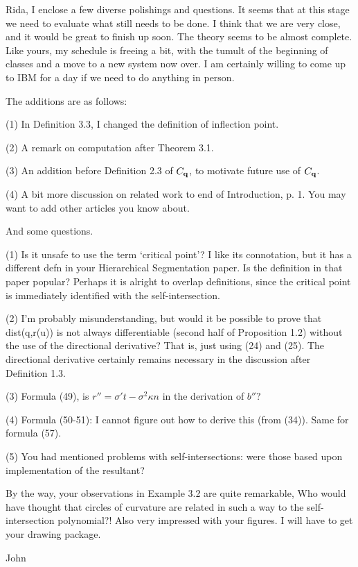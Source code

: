 Rida,
	I enclose a few diverse polishings and questions.
It seems that at this stage we need to evaluate what still needs to be done.
I think that we are very close, and it would be great to finish up soon.
The theory seems to be almost complete.
Like yours, my schedule is freeing a bit, with the tumult of the
beginning of classes and a move to a new system now over.
I am certainly willing to come up to IBM for a day if we need to do 
anything in person.


The additions are as follows:

(1) In Definition 3.3, I changed the definition of inflection point.

(2) A remark on computation after Theorem 3.1.

(3) An addition before Definition 2.3 of $C_{\bf q}$,
	to motivate future use of $C_{\bf q}$.

(4) A bit more discussion on related work to end of Introduction, p. 1.
	You may want to add other articles you know about.



And some questions.

(1) Is it unsafe to use the term `critical point'?  
I like its connotation, but it has a different defn in your Hierarchical
Segmentation paper.  Is the definition in that paper popular?
Perhaps it is alright to overlap definitions, since the critical point
is immediately identified with the self-intersection.

(2) I'm probably misunderstanding, but
would it be possible to prove that dist(q,r(u)) is not 
always differentiable (second half of Proposition 1.2)
without the use of the directional derivative?
That is, just using (24) and (25).
The directional derivative certainly remains necessary in the discussion
after Definition 1.3.

(3) Formula (49), is $r'' = \sigma' t - \sigma^2 \kappa n$
	in the derivation of $b''$?

(4) Formula (50-51): I cannot figure out how to derive this (from (34)).
	Same for formula (57).

(5) You had mentioned problems with self-intersections: were those based
	upon implementation of the resultant?



By the way, your observations in Example 3.2 are quite remarkable,
Who would have thought that circles of curvature are related in 
such a way to the self-intersection polynomial?!
Also very impressed with your figures.
I will have to get your drawing package.


						John